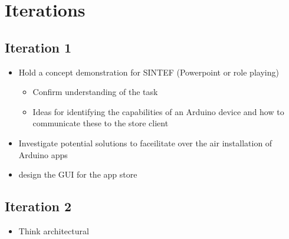 \chapter{Iterations}
\section{Iteration 1}
\begin{itemize}
	\item{Hold a concept demonstration for SINTEF (Powerpoint or role playing)}
	\begin{itemize}
		\item{Confirm understanding of the task}
		\item{Ideas for identifying the capabilities of an Arduino device and how to communicate these to the store client}
	\end{itemize}
	\item{Investigate potential solutions to faceilitate over the air installation of Arduino apps}
	\item{design the GUI for the app store}
\end{itemize}

\section{Iteration 2}
\begin{itemize}
	\item{Think architectural}
\end{itemize}